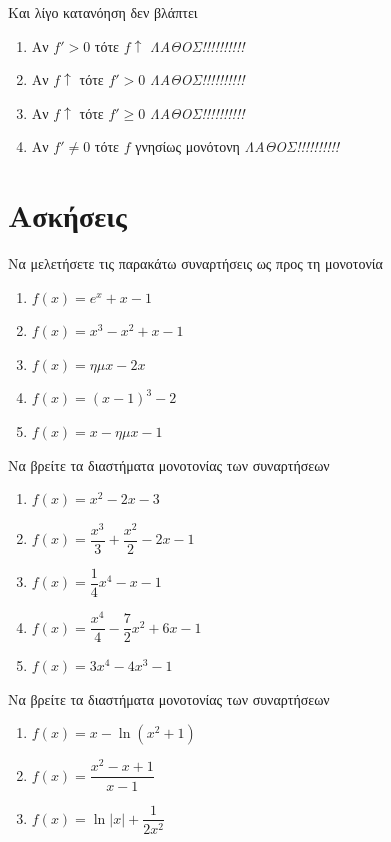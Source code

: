 \documentclass{presentation}
\begin{document}
\begin{frame}{Και λίγο κατανόηση δεν βλάπτει}
  \begin{enumerate}
    \item<1-> Αν $f'>0$ τότε $f\uparrow$  {\emph{ΛΑΘΟΣ!!!!!!!!!!}}
    \item<3-> Αν $f\uparrow$ τότε $f'>0$  {\emph{ΛΑΘΟΣ!!!!!!!!!!}}
    \item<5-> Αν $f\uparrow$ τότε $f'\ge 0$  {\emph{ΛΑΘΟΣ!!!!!!!!!!}}
    \item<7-> Αν $f'\ne 0$ τότε $f$ γνησίως μονότονη  {\emph{ΛΑΘΟΣ!!!!!!!!!!}}
  \end{enumerate}
\end{frame}

\section{Ασκήσεις}
\begin{askisi}
  Να μελετήσετε τις παρακάτω συναρτήσεις ως προς τη μονοτονία
  \begin{enumerate}
    \item<1-> $f(x)=e^x+x-1$
    \item<2-> $f(x)=x^3-x^2+x-1$
    \item<3-> $f(x)=ημx-2x$
    \item<4-> $f(x)=(x-1)^3-2$
    \item<5-> $f(x)=x-ημx-1$
  \end{enumerate}

\end{askisi}

\begin{askisi}
  Να βρείτε τα διαστήματα μονοτονίας των συναρτήσεων
  \begin{enumerate}
    \item<1-> $f(x)=x^2-2x-3$
    \item<2-> $f(x)=\dfrac{x^3}{3}+\dfrac{x^2}{2}-2x-1$
    \item<3-> $f(x)=\dfrac{1}{4}x^4-x-1$
    \item<4-> $f(x)=\dfrac{x^4}{4}-\dfrac{7}{2}x^2+6x-1$
    \item<5-> $f(x)=3x^4-4x^3-1$
  \end{enumerate}

\end{askisi}

\begin{askisi}
  Να βρείτε τα διαστήματα μονοτονίας των συναρτήσεων
  \begin{enumerate}
    \item<1-> $f(x)=x-\ln (x^2+1)$
    \item<2-> $f(x)=\dfrac{x^2-x+1}{x-1}$
    \item<3-> $f(x)=\ln |x|+\dfrac{1}{2x^2}$
  \end{enumerate}

\end{askisi}
\end{document}
